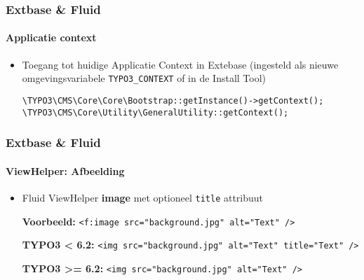 
\begin{frame}[fragile]
	\frametitle{Extbase \& Fluid}
	\framesubtitle{Applicatie context}

	\begin{itemize}
		\item Toegang tot huidige Applicatie Context in Extebase\newline
			(ingesteld als nieuwe omgevingsvariabele \texttt{TYPO3\_CONTEXT} of in de Install Tool)\newline

			\lstinline!\TYPO3\CMS\Core\Core\Bootstrap::getInstance()->getContext();!
			\lstinline!\TYPO3\CMS\Core\Utility\GeneralUtility::getContext();!

	\end{itemize}

\end{frame}


\begin{frame}[fragile]
	\frametitle{Extbase \& Fluid}
	\framesubtitle{ViewHelper: Afbeelding}

	\begin{itemize}
		\item Fluid ViewHelper \textbf{image} met optioneel \texttt{title} attribuut\newline

			\smaller\textbf{Voorbeeld:}\normalsize\newline
			\lstinline!<f:image src="background.jpg" alt="Text" />!
			\newline

			\smaller\textbf{TYPO3 < 6.2:}\normalsize\newline
			\lstinline!<img src="background.jpg" alt="Text" title="Text" />!
			\newline

			\smaller\textbf{TYPO3 >= 6.2:}\normalsize\newline
			\lstinline!<img src="background.jpg" alt="Text" />!

	\end{itemize}

\end{frame}

